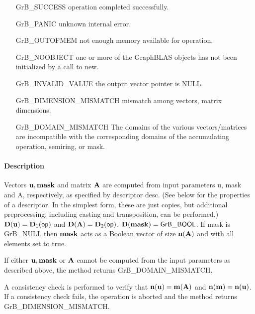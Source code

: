 \begin{itemize}[leftmargin=2.1in]
\item[{\sf GrB\_SUCCESS}]             operation completed successfully.
\item[{\sf GrB\_PANIC}]               unknown internal error.
\item[{\sf GrB\_OUTOFMEM}]            not enough memory available for operation.
\item[{\sf GrB\_NOOBJECT}]          one or more of the GraphBLAS objects has
                                    not been initialized by a call to {\sf new}.
\item[{\sf GrB\_INVALID\_VALUE}]      the output vector pointer is {\sf NULL}.
\item[{\sf GrB\_DIMENSION\_MISMATCH}] mismatch among vectors, matrix dimensions.

	\item[{\sf GrB\_DOMAIN\_MISMATCH}]    The domains of the various
	vectors/matrices are incompatible with the corresponding domains of the
	accumulating operation, semiring, or mask.
\end{itemize}

\paragraph{Description}

Vectors ${\bf u}, {\bf mask}$ and matrix ${\bf A}$ are computed from
input parameters {\sf u}, {\sf mask} and {\sf A}, respectively, as specified
by descriptor {\sf desc}. (See below for the properties of a descriptor. In
the simplest form, these are just copies, but additional preprocessing,
including casting and transposition, can be performed.)  $\bold{D}({\bf u}) =
\bold{D}_1({\sf op})$ and $\bold{D}({\bf A}) = \bold{D}_2({\sf op})$.
$\bold{D}({\bf mask}) = {\sf GrB\_BOOL}$.  If {\sf mask} is {\sf GrB\_NULL}
then ${\bf mask}$ acts as a Boolean vector of size $\bold{n}({\bf A})$
and with all elements set to {\sf true}.

If either ${\bf u}, {\bf mask}$ or ${\bf A}$ cannot be computed
from the input parameters as described above, the method returns {\sf
GrB\_DOMAIN\_MISMATCH}.

A consistency check is performed to verify that $\bold{n}({\bf u})
= \bold{m}({\bf A})$ and $\bold{n}({\bf m}) =
\bold{n}({\bf u})$. If a consistency check fails, the operation is
aborted and the method returns {\sf GrB\_DIMENSION\_MISMATCH}.

